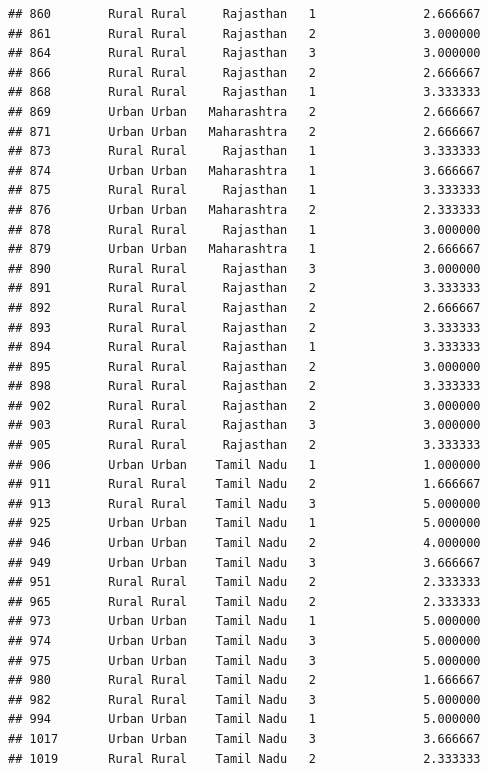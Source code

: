 \documentclass[
]{article}
\begin{document}
\begin{verbatim}
## 860        Rural Rural     Rajasthan   1               2.666667
## 861        Rural Rural     Rajasthan   2               3.000000
## 864        Rural Rural     Rajasthan   3               3.000000
## 866        Rural Rural     Rajasthan   2               2.666667
## 868        Rural Rural     Rajasthan   1               3.333333
## 869        Urban Urban   Maharashtra   2               2.666667
## 871        Urban Urban   Maharashtra   2               2.666667
## 873        Rural Rural     Rajasthan   1               3.333333
## 874        Urban Urban   Maharashtra   1               3.666667
## 875        Rural Rural     Rajasthan   1               3.333333
## 876        Urban Urban   Maharashtra   2               2.333333
## 878        Rural Rural     Rajasthan   1               3.000000
## 879        Urban Urban   Maharashtra   1               2.666667
## 890        Rural Rural     Rajasthan   3               3.000000
## 891        Rural Rural     Rajasthan   2               3.333333
## 892        Rural Rural     Rajasthan   2               2.666667
## 893        Rural Rural     Rajasthan   2               3.333333
## 894        Rural Rural     Rajasthan   1               3.333333
## 895        Rural Rural     Rajasthan   2               3.000000
## 898        Rural Rural     Rajasthan   2               3.333333
## 902        Rural Rural     Rajasthan   2               3.000000
## 903        Rural Rural     Rajasthan   3               3.000000
## 905        Rural Rural     Rajasthan   2               3.333333
## 906        Urban Urban    Tamil Nadu   1               1.000000
## 911        Rural Rural    Tamil Nadu   2               1.666667
## 913        Rural Rural    Tamil Nadu   3               5.000000
## 925        Urban Urban    Tamil Nadu   1               5.000000
## 946        Urban Urban    Tamil Nadu   2               4.000000
## 949        Urban Urban    Tamil Nadu   3               3.666667
## 951        Rural Rural    Tamil Nadu   2               2.333333
## 965        Rural Rural    Tamil Nadu   2               2.333333
## 973        Urban Urban    Tamil Nadu   1               5.000000
## 974        Urban Urban    Tamil Nadu   3               5.000000
## 975        Urban Urban    Tamil Nadu   3               5.000000
## 980        Rural Rural    Tamil Nadu   2               1.666667
## 982        Rural Rural    Tamil Nadu   3               5.000000
## 994        Urban Urban    Tamil Nadu   1               5.000000
## 1017       Urban Urban    Tamil Nadu   3               3.666667
## 1019       Rural Rural    Tamil Nadu   2               2.333333

\end{verbatim}
\end{document}
